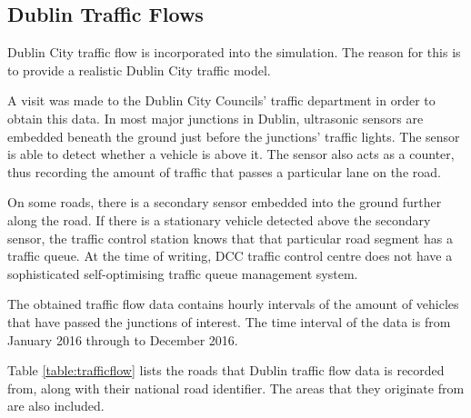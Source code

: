 \subsection{Dublin Traffic Flows} \label{ssec:traffic_flows}
Dublin City traffic flow is incorporated into the simulation. The reason for this is to provide a realistic Dublin City traffic model. 

A visit was made to the Dublin City Councils' traffic department in order to obtain this data. In most major junctions in Dublin, ultrasonic sensors are embedded beneath the ground just before the junctions' traffic lights. The sensor is able to detect whether a vehicle is above it. The sensor also acts as a counter, thus recording the amount of traffic that passes a particular lane on the road. 

On some roads, there is a secondary sensor embedded into the ground further along the road. If there is a stationary vehicle detected above the secondary sensor, the traffic control station knows that that particular road segment has a traffic queue. At the time of writing, DCC traffic control centre does not have a sophisticated self-optimising traffic queue management system.

The obtained traffic flow data contains hourly intervals of the amount of vehicles that have passed the junctions of interest. The time interval of the data is from January 2016 through to December 2016.

Table \ref{table:trafficflow} lists the roads that Dublin traffic flow data is recorded from, along with their national road identifier. The areas that they originate from are also included.

